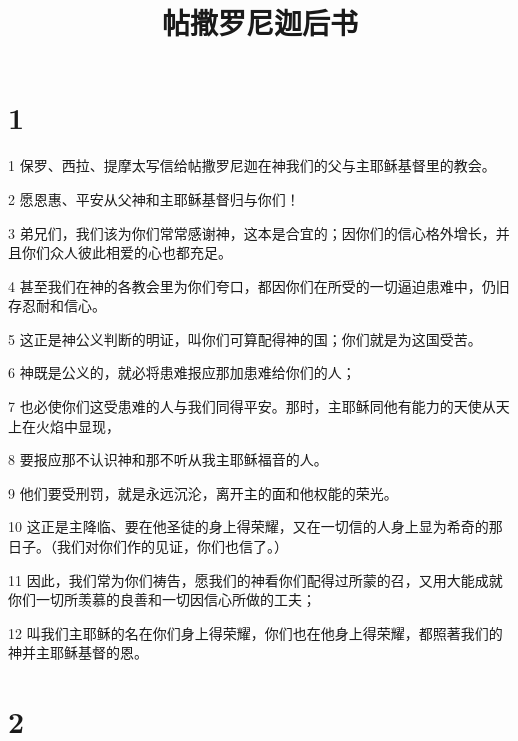 

\title{帖撒罗尼迦后书}


\chapter{1}

\par 1 保罗、西拉、提摩太写信给帖撒罗尼迦在神我们的父与主耶稣基督里的教会。
\par 2 愿恩惠、平安从父神和主耶稣基督归与你们！
\par 3 弟兄们，我们该为你们常常感谢神，这本是合宜的；因你们的信心格外增长，并且你们众人彼此相爱的心也都充足。
\par 4 甚至我们在神的各教会里为你们夸口，都因你们在所受的一切逼迫患难中，仍旧存忍耐和信心。
\par 5 这正是神公义判断的明证，叫你们可算配得神的国；你们就是为这国受苦。
\par 6 神既是公义的，就必将患难报应那加患难给你们的人；
\par 7 也必使你们这受患难的人与我们同得平安。那时，主耶稣同他有能力的天使从天上在火焰中显现，
\par 8 要报应那不认识神和那不听从我主耶稣福音的人。
\par 9 他们要受刑罚，就是永远沉沦，离开主的面和他权能的荣光。
\par 10 这正是主降临、要在他圣徒的身上得荣耀，又在一切信的人身上显为希奇的那日子。（我们对你们作的见证，你们也信了。）
\par 11 因此，我们常为你们祷告，愿我们的神看你们配得过所蒙的召，又用大能成就你们一切所羡慕的良善和一切因信心所做的工夫；
\par 12 叫我们主耶稣的名在你们身上得荣耀，你们也在他身上得荣耀，都照著我们的神并主耶稣基督的恩。

\chapter{2}

